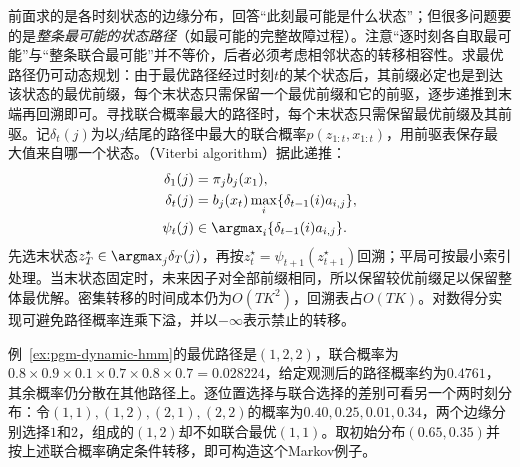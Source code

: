 前面求的是各时刻状态的边缘分布，回答“此刻最可能是什么状态”；但很多问题要的是\emph{整条最可能的状态路径}（如最可能的完整故障过程）。注意“逐时刻各自取最可能”与“整条联合最可能”并不等价，后者必须考虑相邻状态的转移相容性。求最优路径仍可动态规划：由于最优路径经过时刻$t$的某个状态后，其前缀必定也是到达该状态的最优前缀，每个末状态只需保留一个最优前缀和它的前驱，逐步递推到末端再回溯即可。寻找联合概率最大的路径时，每个末状态只需保留最优前缀及其前驱。记$\delta_t(j)$为以$j$结尾的路径中最大的联合概率$p(z_{1:t},x_{1:t})$，用前驱表保存最大值来自哪一个状态。（Viterbi algorithm）据此递推：
\begin{equation}
  \begin{aligned}
    \delta_1(j)&=\pi_jb_j(x_1),\\
    \delta_t(j)&=b_j(x_t)\max_i
      \{\delta_{t-1}(i)a_{i,j}\},\\
    \psi_t(j)&\in\argmax_i
      \{\delta_{t-1}(i)a_{i,j}\}.
  \end{aligned}
  \label{eq:pgm-dynamic-viterbi}
\end{equation}
先选末状态$z_T^\star\in\argmax_j\delta_T(j)$，再按$z_t^\star=\psi_{t+1}(z_{t+1}^\star)$回溯；平局可按最小索引处理。当末状态固定时，未来因子对全部前缀相同，所以保留较优前缀足以保留整体最优解。密集转移的时间成本仍为$O(TK^2)$，回溯表占$O(TK)$。对数得分实现可避免路径概率连乘下溢，并以$-\infty$表示禁止的转移。

例~\ref{ex:pgm-dynamic-hmm}的最优路径是$(1,2,2)$，联合概率为$0.8\times0.9\times0.1\times0.7\times0.8\times0.7=0.028224$，给定观测后的路径概率约为$0.4761$，其余概率仍分散在其他路径上。逐位置选择与联合选择的差别可看另一个两时刻分布：令$(1,1),(1,2),(2,1),(2,2)$的概率为$0.40,0.25,0.01,0.34$，两个边缘分别选择$1$和$2$，组成的$(1,2)$却不如联合最优$(1,1)$。取初始分布$(0.65,0.35)$并按上述联合概率确定条件转移，即可构造这个Markov例子。

